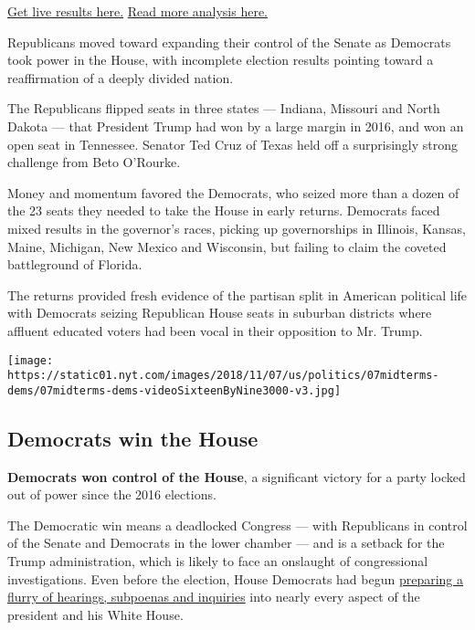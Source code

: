 \href{https://www.nytimes.com/interactive/2018/11/06/us/elections/results-house-elections.html}{Get
live results here.} \textbar{}
\href{https://www.nytimes.com/2018/11/06/us/politics/midterm-elections-results.html}{Read
more analysis here.}

Republicans moved toward expanding their control of the Senate as
Democrats took power in the House, with incomplete election results
pointing toward a reaffirmation of a deeply divided nation.

The Republicans flipped seats in three states --- Indiana, Missouri and
North Dakota --- that President Trump had won by a large margin in 2016,
and won an open seat in Tennessee. Senator Ted Cruz of Texas held off a
surprisingly strong challenge from Beto O'Rourke.

Money and momentum favored the Democrats, who seized more than a dozen
of the 23 seats they needed to take the House in early returns.
Democrats faced mixed results in the governor's races, picking up
governorships in Illinois, Kansas, Maine, Michigan, New Mexico and
Wisconsin, but failing to claim the coveted battleground of Florida.

The returns provided fresh evidence of the partisan split in American
political life with Democrats seizing Republican House seats in suburban
districts where affluent educated voters had been vocal in their
opposition to Mr. Trump.

\texttt{[image: https://static01.nyt.com/images/2018/11/07/us/politics/07midterms-dems/07midterms-dems-videoSixteenByNine3000-v3.jpg]}

\hypertarget{democrats-win-the-house}{%
\subsection{Democrats win the House}\label{democrats-win-the-house}}

\textbf{Democrats won control of the House}, a significant victory for a
party locked out of power since the 2016 elections.

The Democratic win means a deadlocked Congress --- with Republicans in
control of the Senate and Democrats in the lower chamber --- and is a
setback for the Trump administration, which is likely to face an
onslaught of congressional investigations. Even before the election,
House Democrats had begun
\href{https://www.nytimes.com/2018/09/03/us/politics/democrats-trump-impeachment.html}{preparing
a flurry of hearings, subpoenas and inquiries} into nearly every aspect
of the president and his White House.

